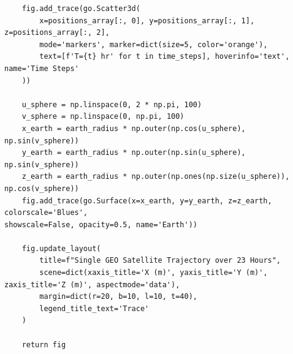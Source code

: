 \documentclass[11pt]{article}
\begin{document}
\begin{Verbatim}
    fig.add_trace(go.Scatter3d(
        x=positions_array[:, 0], y=positions_array[:, 1], z=positions_array[:, 2],
        mode='markers', marker=dict(size=5, color='orange'),
        text=[f'T={t} hr' for t in time_steps], hoverinfo='text', name='Time Steps'
    ))

    u_sphere = np.linspace(0, 2 * np.pi, 100)
    v_sphere = np.linspace(0, np.pi, 100)
    x_earth = earth_radius * np.outer(np.cos(u_sphere), np.sin(v_sphere))
    y_earth = earth_radius * np.outer(np.sin(u_sphere), np.sin(v_sphere))
    z_earth = earth_radius * np.outer(np.ones(np.size(u_sphere)), np.cos(v_sphere))
    fig.add_trace(go.Surface(x=x_earth, y=y_earth, z=z_earth, colorscale='Blues',
showscale=False, opacity=0.5, name='Earth'))

    fig.update_layout(
        title=f"Single GEO Satellite Trajectory over 23 Hours",
        scene=dict(xaxis_title='X (m)', yaxis_title='Y (m)', zaxis_title='Z (m)', aspectmode='data'),
        margin=dict(r=20, b=10, l=10, t=40),
        legend_title_text='Trace'
    )

    return fig
\end{Verbatim}
\end{document}

